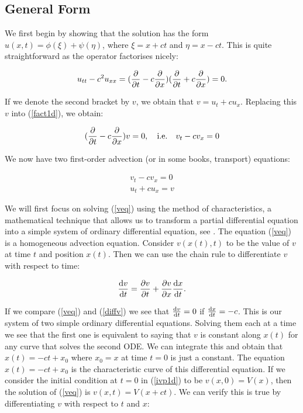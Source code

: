 \documentclass[a4paper, 12pt]{article}
\numberwithin{equation}{section}
\begin{document}
\subsection{General Form}

We first begin by showing that the solution has the form $u(x, t)=\phi(\xi)+\psi(\eta)$, where $\xi=x+ct$ and $\eta=x-ct$. This is quite straightforward
as the operator factorises nicely:

\begin{equation} \label{fact1d}
    u_{tt}-c^2u_{xx}=(\diffp[1]{}{t} - c \diffp[1]{}{x})(\diffp[1]{}{t} + c \diffp[1]{}{x})=0.
\end{equation}

If we denote the second bracket by $v$, we obtain that $v=u_t+cu_x$. Replacing this $v$ into (\ref{fact1d}), we obtain:

\begin{equation*} 
    (\diffp[1]{}{t} -c \diffp[1]{}{x})v=0, \quad \textrm{i.e.} \quad v_t-cv_x=0
\end{equation*}

We now have two first-order advection (or in some books, transport) equations:

\begin{align}
    v_t-cv_x=0 \label{veq}\\
    u_t+cu_x=v \label{ueq}
\end{align}

We will first focus on solving (\ref{veq}) using the method of characteristics, a mathematical technique that allows us to transform a partial differential
equation into a simple system of ordinary differential equation, see \cite{Ev}. The equation (\ref{veq}) is a homogeneous
advection equation. Consider $v(x(t),t)$ to be the value of $v$ at time $t$ and position $x(t)$. Then we can use the chain rule to differentiate
$v$ with respect to time:

\begin{equation} \label{diffv}
    \diff{v}{t}=\diffp[1]{v}{t}+\diffp[1]{v}{x}\diff{x}{t}.
\end{equation}

If we compare (\ref{veq}) and (\ref{diffv}) we see that $\diff{v}{t}=0$ if $\diff{x}{t}=-c$. This is our system of two simple ordinary differential 
equations. Solving them each at a time we see that the first one is equivalent to saying that $v$ is constant along $x(t)$ for any curve that 
solves the second ODE. We can integrate this and obtain that $x(t)=-ct+x_0$ where $x_0=x$ at time $t=0$ is just a constant. The equation $x(t)=-ct+x_0$
is the characteristic curve of this differential equation. If we consider the initial condition at $t=0$ in (\ref{ivp1d}) to be $v(x,0)=V(x)$, then the 
solution of (\ref{veq}) is $v(x,t)=V(x+ct)$. We can verify this is true by differentiating $v$ with respect to $t$ and $x$:
\end{document}
